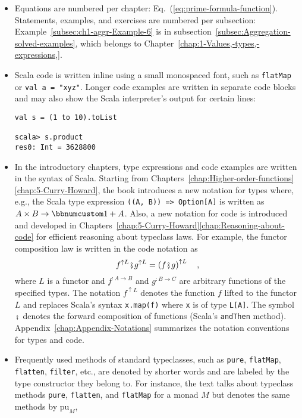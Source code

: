 \begin{itemize}
\item Equations are numbered per chapter: Eq.~(\ref{eq:prime-formula-function}).
Statements, examples, and exercises are numbered per subsection: Example~\ref{subsec:ch1-aggr-Example-6}
is in subsection~\ref{subsec:Aggregation-solved-examples}, which
belongs to Chapter~\ref{chap:1-Values,-types,-expressions,}.
\item Scala code is written inline using a small monospaced font, such as
\lstinline!flatMap! or \lstinline!val a = "xyz"!. Longer code examples
are written in separate code blocks and may also show the Scala interpreter\textsf{'}s
output for certain lines:
\begin{lstlisting}[mathescape=true]
val s = (1 to 10).toList

scala> s.product
res0: Int = 3628800 
\end{lstlisting}
\item In the introductory chapters, type expressions and code examples are
written in the syntax of Scala. Starting from Chapters~\ref{chap:Higher-order-functions}\textendash \ref{chap:5-Curry-Howard},
the book introduces a new notation for types where, e.g., the Scala
type expression \lstinline!((A, B)) => Option[A]! is written as $A\times B\rightarrow\bbnum 1+A$.
Also, a new notation for code is introduced and developed in Chapters~\ref{chap:5-Curry-Howard}\textendash \ref{chap:Reasoning-about-code}
for efficient reasoning about typeclass laws. For example, the functor
composition law is written in the code notation as
\[
f^{\uparrow L}\bef g^{\uparrow L}=\left(f\bef g\right)^{\uparrow L}\quad,
\]
where $L$ is a functor and $f^{:A\rightarrow B}$ and $g^{:B\rightarrow C}$
are arbitrary functions of the specified types. The notation $f^{\uparrow L}$
denotes the function $f$ lifted to the functor $L$ and replaces
Scala\textsf{'}s syntax \lstinline!x.map(f)! where \lstinline!x! is of type
\lstinline!L[A]!. The symbol $\bef$ denotes the forward composition
of functions (Scala\textsf{'}s \lstinline!andThen! method). Appendix~\ref{chap:Appendix-Notations}
summarizes the notation conventions for types and code.
\item Frequently used methods of standard typeclasses, such as \lstinline!pure!,
\lstinline!flatMap!, \lstinline!flatten!, \lstinline!filter!, etc.,
are denoted by shorter words and are labeled by the type constructor
they belong to. For instance, the text talks about typeclass methods
\lstinline!pure!, \lstinline!flatten!, and \lstinline!flatMap!
for a monad $M$ but denotes the same methods by $\text{pu}_{M}$,

\end{itemize}
